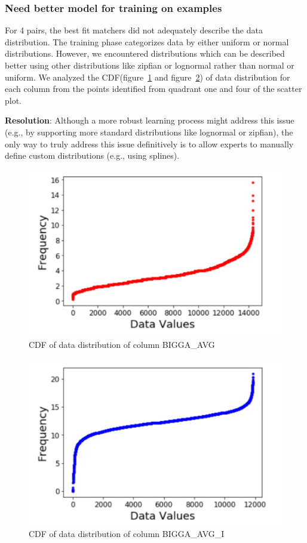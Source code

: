 \subsubsection{Need better model for training on examples}
For 4 pairs, the best fit matchers did not adequately describe the data distribution.
The training phase categorizes data by either uniform or normal distributions. 
However, we encountered distributions which can be described better using other distributions like zipfian or lognormal rather than normal or uniform.
We analyzed the CDF(figure~\ref{fig:Distribution 1} and figure~\ref{fig:Distribution 2}) of data distribution for each column from the points identified from quadrant one and four of the scatter plot. 

\textbf{Resolution}: Although a more robust learning process might address this issue (e.g., by supporting more standard distributions like lognormal or zipfian), the only way to truly address this issue definitively is to allow experts to manually define custom distributions (e.g., using splines).

\begin{figure}[H]
	\centering
	\includegraphics[width=0.8\columnwidth]{graphics/Challenge1_1}
	\caption{CDF of data distribution of column BIGGA\_AVG}
	\label{fig:Distribution 1}
\end{figure}

\begin{figure}[H]
	\centering
	\includegraphics[width=0.8\columnwidth]{graphics/Challenge1_2}
	\caption{CDF of data distribution of column BIGGA\_AVG\_I}
	\label{fig:Distribution 2}
\end{figure}


